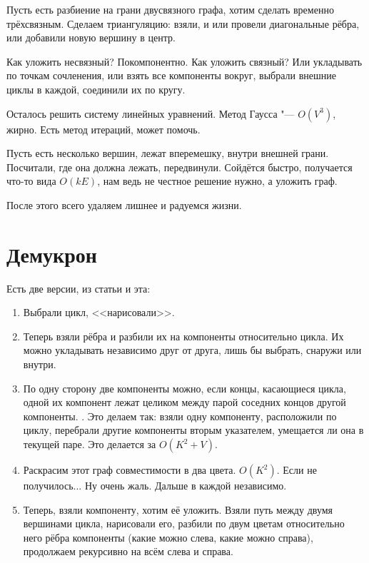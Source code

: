 Пусть есть разбиение на грани двусвязного графа, хотим сделать временно трёхсвязным.
Сделаем триангуляцию: взяли, и или провели диагональные рёбра, или добавили новую вершину в центр.

Как уложить несвязный? Покомпонентно.
Как уложить связный? Или укладывать по точкам сочленения, или взять все компоненты вокруг, выбрали внешние циклы в каждой, соединили их по кругу.

Осталось решить систему линейных уравнений.
Метод Гаусса "--- $O(V^3)$, жирно.
Есть метод итераций, может помочь.

Пусть есть несколько вершин, лежат вперемешку, внутри внешней грани. Посчитали, где она должна лежать, передвинули.
Сойдётся быстро, получается что-то вида $O(kE)$, нам ведь не честное решение нужно, а уложить граф.

После этого всего удаляем лишнее и радуемся жизни.

\section{Демукрон}

Есть две версии, из статьи и эта:

\begin{enumerate}
\item
	Выбрали цикл, <<нарисовали>>.
\item
	Теперь взяли рёбра и разбили их на компоненты относительно цикла.
	Их можно укладывать независимо друг от друга, лишь бы выбрать, снаружи или внутри.
\item
	По одну сторону две компоненты можно, если концы, касающиеся цикла, одной их компонент лежат целиком между парой соседних концов другой компоненты. \TODO. Это делаем так: взяли одну компоненту, расположили по циклу, перебрали другие компоненты вторым указателем, умещается ли она в текущей паре. Это делается за $O(K^2 + V)$.
\item
	Раскрасим этот граф совместимости в два цвета. $O(K^2)$. Если не получилось... Ну очень жаль. Дальше в каждой независимо.
\item
	Теперь, взяли компоненту, хотим её уложить.
	Взяли путь между двумя вершинами цикла, нарисовали его, разбили по двум цветам относительно него рёбра компоненты (какие можно слева, какие можно справа), продолжаем рекурсивно на всём слева и справа.
\end{enumerate}
